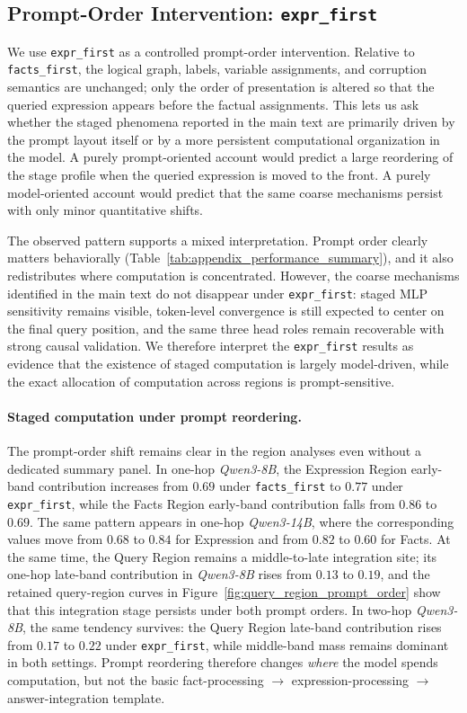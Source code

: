 \documentclass[11pt]{article}
\begin{document}
\subsection{Prompt-Order Intervention: \texttt{expr\_first}}
\label{sec:appendix_prompt_order}
We use \texttt{expr\_first} as a controlled prompt-order intervention. Relative to \texttt{facts\_first}, the logical graph, labels, variable assignments, and corruption semantics are unchanged; only the order of presentation is altered so that the queried expression appears before the factual assignments. This lets us ask whether the staged phenomena reported in the main text are primarily driven by the prompt layout itself or by a more persistent computational organization in the model. A purely prompt-oriented account would predict a large reordering of the stage profile when the queried expression is moved to the front. A purely model-oriented account would predict that the same coarse mechanisms persist with only minor quantitative shifts.

The observed pattern supports a mixed interpretation. Prompt order clearly matters behaviorally (Table~\ref{tab:appendix_performance_summary}), and it also redistributes where computation is concentrated. However, the coarse mechanisms identified in the main text do not disappear under \texttt{expr\_first}: staged MLP sensitivity remains visible, token-level convergence is still expected to center on the final query position, and the same three head roles remain recoverable with strong causal validation. We therefore interpret the \texttt{expr\_first} results as evidence that the existence of staged computation is largely model-driven, while the exact allocation of computation across regions is prompt-sensitive.

\paragraph{Staged computation under prompt reordering.}
The prompt-order shift remains clear in the region analyses even without a dedicated summary panel. In one-hop \textit{Qwen3-8B}, the Expression Region early-band contribution increases from $0.69$ under \texttt{facts\_first} to $0.77$ under \texttt{expr\_first}, while the Facts Region early-band contribution falls from $0.86$ to $0.69$. The same pattern appears in one-hop \textit{Qwen3-14B}, where the corresponding values move from $0.68$ to $0.84$ for Expression and from $0.82$ to $0.60$ for Facts. At the same time, the Query Region remains a middle-to-late integration site; its one-hop late-band contribution in \textit{Qwen3-8B} rises from $0.13$ to $0.19$, and the retained query-region curves in Figure~\ref{fig:query_region_prompt_order} show that this integration stage persists under both prompt orders. In two-hop \textit{Qwen3-8B}, the same tendency survives: the Query Region late-band contribution rises from $0.17$ to $0.22$ under \texttt{expr\_first}, while middle-band mass remains dominant in both settings. Prompt reordering therefore changes \emph{where} the model spends computation, but not the basic fact-processing $\rightarrow$ expression-processing $\rightarrow$ answer-integration template.
\end{document}
